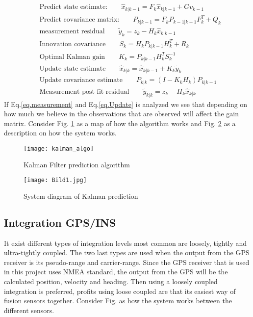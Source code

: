 \begin{align}
&\textrm{Predict state estimate:} \qquad \hat{x}_{k|k-1}=F_k\hat{x}_{k|k-1}+Gv_{k-1}\\
&\textrm{Predict covariance matrix:}\qquad P_{k|k-1}=F_{k}P_{k-1|k-1}F^T_{k}+Q_{k}\\
\label{eq.measurement}
&\textrm{measurement residual}\qquad \tilde{y}_k=z_k-H_k\hat{x}_{k|k-1}\\
&\textrm{Innovation covariance}\qquad S_k=H_kP_{k|k-1}H_k^T+R_k \\
&\textrm{Optimal Kalman gain}\qquad K_k=P_{k|k-1}H_k^TS_k^{-1}\\
\label{eq.Update}
&\textrm{Update state estimate}\qquad \hat{x}_{k|k}=\hat{x}_{k|k-1}+K_k\tilde{y}_k\\
&\textrm{Update covariance estimate}\qquad P_{k|k}=(I-K_kH_k)P_{k|k-1}\\
&\textrm{Measurement post-fit residual} \qquad \tilde{y}_{k|k}=z_k-H_k\hat{x}_{k|k}
\end{align}
If Eq.\eqref{eq.measurement} and Eq.\eqref{eq.Update} is analyzed we see that depending on how much we believe in the observations that are observed will affect the gain matrix. Consider Fig. \ref{kalman_algo} as a map of how the algorithm works and Fig. \ref{kalman_system} as a description on how the system works.
\begin{figure}[H]
\centering
\texttt{[image: kalman\_algo]}
\caption{Kalman Filter prediction algorithm}
\label{kalman_algo}
\end{figure}

\begin{figure}[H]
\centering
\texttt{[image: Bild1.jpg]}
\caption{System diagram of Kalman prediction}
\label{kalman_system}
\end{figure}

\subsection*{Integration GPS/INS}
It exist different types of integration levels most common are loosely, tightly and ultra-tightly coupled. The two last types are used when the output from the GPS receiver is its pseudo-range and carrier-range. Since the GPS receiver that is used in this project uses NMEA standard, the output from the GPS will be the calculated position, velocity and heading. Then using a loosely coupled integration is preferred, profits using loose coupled are that its easiest way of fusion sensors together. Consider Fig. as how the system works between the different sensors.

